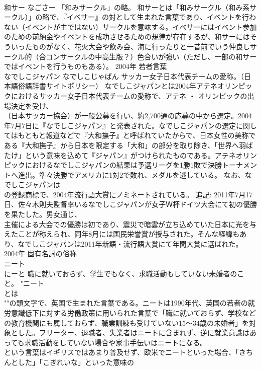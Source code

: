 \documentclass[8pt]{extreport}
\begin{document}
\begin{CJK}{UTF8}{min}
\\	和サー	なごさー	「和みサークル」の略。	和サーとは「和みサークル（和み系サークル）」の略で、『イベサー』の対として生まれた言葉であり、イベントを行わない（イベントが主ではない）サークルを意味する。イベサーにはイベント参加のための前納金やイベントを成功させるための規律が存在するが、和サーにはそういったものがなく、花火大会や飲み会、海に行ったりと一昔前でいう仲良しサークル的（合コンサークルの中高生版？）色合いが強い（ただし、一部の和サーではイベントを行うものもある）。	2004年	若者言葉	
\\	なでしこジャパン	なでしこじゃぱん	サッカー女子日本代表チームの愛称。（日本語俗語辞書サイトポリシー）	なでしこジャパンとは2004年アテネオリンピックにおけるサッカー女子日本代表チームの愛称で、アテネ ・ オリンピックの出場決定を受け、
\\	（日本サッカー協会）が一般公募を行い、約2,700通の応募の中から選定。2004年7月7日に『なでしこジャパン』と発表された。なでしこジャパンの選定に関してはもともと報道などで『大和撫子』と呼ばれていたからで、日本女性の美称である『大和撫子』から日本を限定する「大和」の部分を取り除き、「世界へ羽ばたけ」という意味を込めて『ジャパン』がつけられたものである。アテネオリンピックにおけるなでしこジャパンの結果は予選リーグを1勝1敗で決勝トーナメントへ進出。準々決勝でアメリカに1対2で敗れ、メダルを逃している。 なお、なでしこジャパンは
\\	の登録商標で、2004年流行語大賞にノミネートされている。 追記: 2011年7月17日、佐々木則夫監督率いるなでしこジャパンが女子Ｗ杯ドイツ大会にて初の優勝を果たした。男女通じ、
\\	主催による大会での優勝は初であり、震災で暗雲が立ち込めていた日本に光を与えたことが称えられ、同年8月には国民栄誉賞が授与された。そんな経緯もあり、なでしこジャパンは2011年新語・流行語大賞にて年間大賞に選ばれた。	2004年	固有名詞の俗称	
\\	ニート 
\\	にーと	職に就いておらず、学生でもなく、求職活動もしていない未婚者のこと。	"ニート
\\	とは
\\	""の頭文字で、英国で生まれた言葉である。ニートは1990年代、英国の若者の就労意識低下に対する労働政策に用いられた言葉で「職に就いておらず、学校などの教育機関にも属しておらず、職業訓練も受けていない15～34歳の未婚者」を対象とした。フリーター、退職者、失業者はニートに含まれず、逆に就業意識はあっても求職活動をしていない場合や家事手伝いはニートになる。 
\\	という言葉はイギリスではあまり普及せず、欧米でニートといった場合、「きちんとした」「こぎれいな」といった意味の

\end{CJK}
\end{document}
